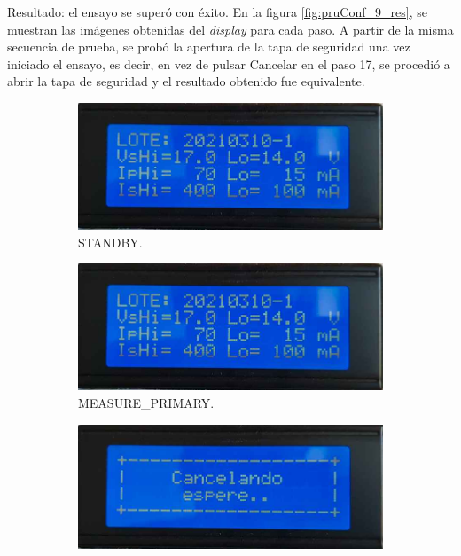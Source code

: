 Resultado: el ensayo se superó con éxito. En la figura \ref{fig:pruConf_9_res}, se muestran las imágenes obtenidas del \textit{display} para cada paso. A partir de la misma secuencia de prueba, se probó la apertura de la tapa de seguridad una vez iniciado el ensayo, es decir, en vez de pulsar Cancelar en el paso 17, se procedió a abrir la tapa de seguridad y el resultado obtenido fue equivalente.

\begin{figure}[!htpb]
     \centering
     \begin{subfigure}[b]{0.4\textwidth}
         \centering
         \includegraphics[width=1.1\textwidth]{./Figures/pru_fail.jpeg}
         \caption{STANDBY.}
         \label{fig:pruConf_9_1}
     \end{subfigure}
          \hfill
     \begin{subfigure}[b]{0.4\textwidth}
         \centering
         \includegraphics[width=1.1\textwidth]{./Figures/pru_fail.jpeg}
         \caption{MEASURE\_PRIMARY.}
         \label{fig:pruConf_9_2}
     \end{subfigure}
           \hfill
     \begin{subfigure}[b]{0.4\textwidth}
         \centering
         \includegraphics[width=1.1\textwidth]{./Figures/cancel.jpeg}

\end{subfigure}
\end{figure}
